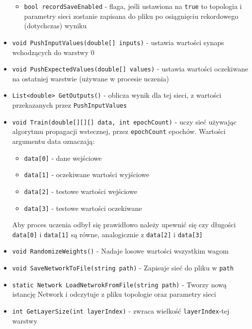 \documentclass[12pt,a4paper]{article}
\begin{document}
\begin{itemize}
\begin{itemize}
            \item \lstinline{bool recordSaveEnabled} - flaga, jeśli ustawiona na \lstinline{true} to topologia i parametry sieci zostanie zapisana do pliku po osiągnięciu rekordowego (dotychczas) wyniku
        \end{itemize}
        \item \lstinline{void PushInputValues(double[] inputs)} - ustawia wartości synaps wchodzących do warstwy 0
        \item \lstinline{void PushExpectedValues(double[] values)} - ustawia wartości oczekiwane na ostatniej warstwie (używane w procesie uczenia)
        \item \lstinline{List<double> GetOutputs()} - oblicza wynik dla tej sieci, z wartości przekazanych przez \lstinline{PushInputValues}
        \item \lstinline{void Train(double[][][] data, int epochCount)} - uczy sieć używając algorytmu propagacji wstecznej, przez \lstinline{epochCount} epochów. Wartości argumentu data oznaczają:
        \begin{itemize}
            \item \lstinline{data[0]} - dane wejściowe
            \item \lstinline{data[1]} - oczekiwane wartości wyjściowe
            \item \lstinline{data[2]} - testowe wartości wejściowe
            \item \lstinline{data[3]} - testowe wartości oczekiwane
        \end{itemize}
        Aby proces uczenia odbył się prawidłowo należy upewnić się czy długości \lstinline{data[0]} i \lstinline{data[1]} są równe, analogicznie z \lstinline{data[2]} i \lstinline{data[3]}
        \item \lstinline{void RandomizeWeights()} - Nadaje losowe wartości wszystkim wagom
        \item \lstinline{void SaveNetworkToFile(string path)} - Zapisuje sieć do pliku w \lstinline{path}
        \item \lstinline{static Network LoadNetwrokFromFile(string path)} - Tworzy nową istancję Network i odczytuje z pliku topologie oraz parametry sieci
        \item \lstinline{int GetLayerSize(int layerIndex)} - zwraca wielkość \lstinline{layerIndex}-tej warstwy 
    \end{itemize}
    
\end{document}
